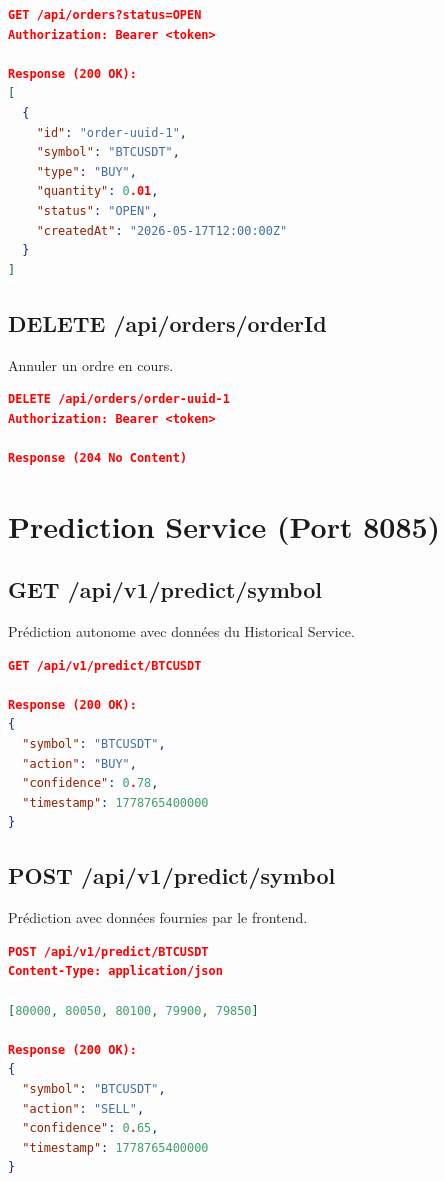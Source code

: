 \documentclass[12pt,a4paper,twoside]{report}
\begin{document}
\begin{lstlisting}[language=json]
GET /api/orders?status=OPEN
Authorization: Bearer <token>

Response (200 OK):
[
  {
    "id": "order-uuid-1",
    "symbol": "BTCUSDT",
    "type": "BUY",
    "quantity": 0.01,
    "status": "OPEN",
    "createdAt": "2026-05-17T12:00:00Z"
  }
]
\end{lstlisting}

\subsection{DELETE /api/orders/{orderId}}
Annuler un ordre en cours.

\begin{lstlisting}[language=json]
DELETE /api/orders/order-uuid-1
Authorization: Bearer <token>

Response (204 No Content)
\end{lstlisting}

\section{Prediction Service (Port 8085)}

\subsection{GET /api/v1/predict/{symbol}}
Prédiction autonome avec données du Historical Service.

\begin{lstlisting}[language=json]
GET /api/v1/predict/BTCUSDT

Response (200 OK):
{
  "symbol": "BTCUSDT",
  "action": "BUY",
  "confidence": 0.78,
  "timestamp": 1778765400000
}
\end{lstlisting}

\subsection{POST /api/v1/predict/{symbol}}
Prédiction avec données fournies par le frontend.

\begin{lstlisting}[language=json]
POST /api/v1/predict/BTCUSDT
Content-Type: application/json

[80000, 80050, 80100, 79900, 79850]

Response (200 OK):
{
  "symbol": "BTCUSDT",
  "action": "SELL",
  "confidence": 0.65,
  "timestamp": 1778765400000
}
\end{lstlisting}
\end{document}
